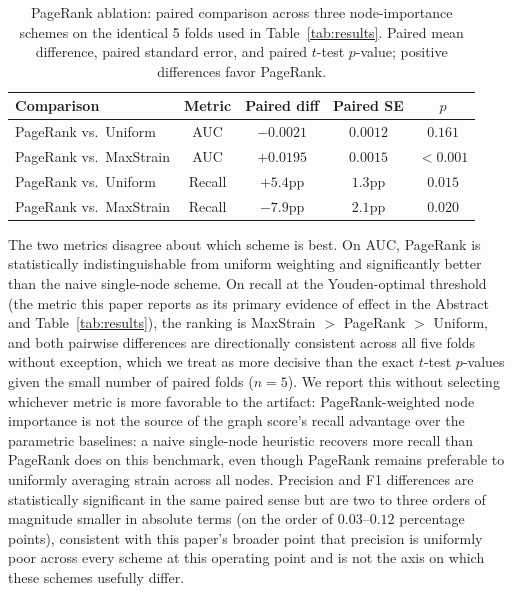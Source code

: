 \documentclass[12pt]{article}
\begin{document}
\begin{table}[tbp]
\centering
\caption{PageRank ablation: paired comparison across three
         node-importance schemes on the identical 5 folds used in
         Table~\ref{tab:results}.  Paired mean difference, paired
         standard error, and paired $t$-test $p$-value; positive
         differences favor PageRank.}
\label{tab:pagerank-ablation}
\small
\begin{tabular}{lcccc}
\toprule
\textbf{Comparison} & \textbf{Metric} & \textbf{Paired diff} & \textbf{Paired SE} & \textbf{$p$} \\
\midrule
PageRank vs.\ Uniform   & AUC    & $-0.0021$ & $0.0012$ & $0.161$ \\
PageRank vs.\ MaxStrain & AUC    & $+0.0195$ & $0.0015$ & $<0.001$ \\
PageRank vs.\ Uniform   & Recall & $+5.4$pp  & $1.3$pp  & $0.015$ \\
PageRank vs.\ MaxStrain & Recall & $-7.9$pp  & $2.1$pp  & $0.020$ \\
\bottomrule
\end{tabular}
\end{table}

The two metrics disagree about which scheme is best.  On AUC, PageRank
is statistically indistinguishable from uniform weighting and
significantly better than the naive single-node scheme.  On recall at
the Youden-optimal threshold (the metric this paper reports as its
primary evidence of effect in the Abstract and Table~\ref{tab:results}),
the ranking is MaxStrain $>$ PageRank $>$ Uniform, and both pairwise
differences are directionally consistent across all five folds without
exception, which we treat as more decisive than the exact $t$-test
$p$-values given the small number of paired folds ($n=5$).  We report
this without selecting whichever metric is more favorable to the
artifact: PageRank-weighted node importance is not the source of the
graph score's recall advantage over the parametric baselines: a naive
single-node heuristic recovers more recall than PageRank does on this
benchmark, even though PageRank remains preferable to uniformly
averaging strain across all nodes.  Precision and F1 differences are
statistically significant in the same paired sense but are two to three
orders of magnitude smaller in absolute terms (on the order of
$0.03$--$0.12$ percentage points), consistent with this paper's
broader point that precision is uniformly poor across every scheme at
this operating point and is not the axis on which these schemes
usefully differ.
\end{document}

